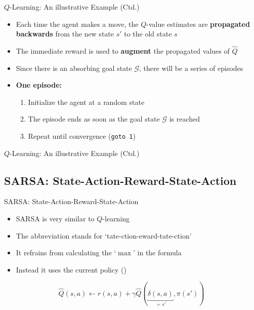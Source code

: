 \begin{frame}{$Q$-Learning: An illustrative Example (Ctd.)}{}
	\begin{itemize}
		\item Each time the agent makes a move, the $Q$-value estimates are \textbf{propagated backwards}
			from the new state $s'$ to the old state $s$
		\item The immediate reward is used to \textbf{augment} the propagated values of $\widehat{Q}$
		\item Since there is an absorbing goal state $\bm{\mathcal{G}}$, there will be a series of episodes
		\item \textbf{One episode:}
		\begin{enumerate}
			\item Initialize the agent at a random state
			\item The episode ends as soon as the goal state $\bm{\mathcal{G}}$ is reached
			\item Repeat until convergence (\texttt{goto 1})
		\end{enumerate}
	\end{itemize}
\end{frame}


\begin{frame}{$Q$-Learning: An illustrative Example (Ctd.)}{}
	
\end{frame}


\subsection{SARSA: State-Action-Reward-State-Action}

\begin{frame}{SARSA: State-Action-Reward-State-Action}{}
	\begin{itemize}
		\item SARSA is very similar to $Q$-learning
		\item The abbreviation stands for `tate-ction-eward-tate-ction'
		\item It refrains from calculating the `$\max$' in the formula
		\item Instead it uses the current policy ()
	\end{itemize}
	
	\vspace*{2mm}
	\begin{boxBlueNoFrame}
		\begin{equation}
			\widehat{Q}(s, a) \longleftarrow r(s, a) + \gamma \widehat{Q}(\underbracket{\delta(s, a)}_{=s'}, \pi(s'))
		\end{equation}
	\end{boxBlueNoFrame}
\end{frame}


